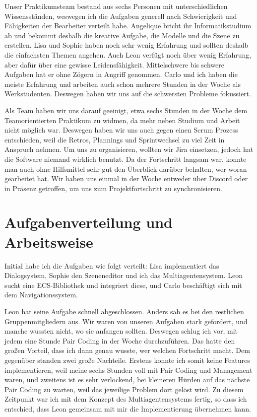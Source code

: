 Unser Praktikumsteam bestand aus sechs Personen mit unterschiedlichen Wissensständen, weswegen ich die Aufgaben generell nach Schwierigkeit und Fähigkeiten der Bearbeiter verteilt habe. Angelique bricht ihr Informatikstudium ab und bekommt deshalb die kreative Aufgabe, die Modelle und die Szene zu erstellen. Lisa und Sophie haben noch sehr wenig Erfahrung und sollten deshalb die einfachsten Themen angehen. Auch Leon verfügt noch über wenig Erfahrung, aber dafür über eine gewisse Leidensfähigkeit. Mittelschwere bis schwere Aufgaben hat er ohne Zögern in Angriff genommen. Carlo und ich haben die meiste Erfahrung und arbeiten auch schon mehrere Stunden in der Woche als Werkstudenten. Deswegen haben wir uns auf die schwersten Probleme fokussiert.

Als Team haben wir uns darauf geeinigt, etwa sechs Stunden in der Woche dem Teamorientierten Praktikum zu widmen, da mehr neben Studium und Arbeit nicht möglich war. Deswegen haben wir uns auch gegen einen Scrum Prozess entschieden, weil die Retros, Plannings und Sprintwechsel zu viel Zeit in Anspruch nehmen. Um uns zu organisieren, wollten wir Jira einsetzen, jedoch hat die Software niemand wirklich benutzt. Da der Fortschritt langsam war, konnte man auch ohne Hilfsmittel sehr gut den Überblick darüber behalten, wer woran gearbeitet hat. Wir haben uns einmal in der Woche entweder über Discord oder in Präsenz getroffen, um uns zum Projektfortschritt zu synchronisieren.

\section{Aufgabenverteilung und Arbeitsweise}

Initial habe ich die Aufgaben wie folgt verteilt: Lisa implementiert das Dialogsystem, Sophie den Szeneneditor und ich das Multiagentensystem. Leon sucht eine ECS-Bibliothek und integriert diese, und Carlo beschäftigt sich mit dem Navigationssystem.

Leon hat seine Aufgabe schnell abgeschlossen. Anders sah es bei den restlichen Gruppenmitgliedern aus. Wir waren von unseren Aufgaben stark gefordert, und manche wussten nicht, wo sie anfangen sollten. Deswegen schlug ich vor, mit jedem eine Stunde Pair Coding in der Woche durchzuführen. Das hatte den großen Vorteil, dass ich dann genau wusste, wer welchen Fortschritt macht. Dem gegenüber standen zwei große Nachteile. Erstens konnte ich somit keine Features implementieren, weil meine sechs Stunden voll mit Pair Coding und Management waren, und zweitens ist es sehr verlockend, bei kleineren Hürden auf das nächste Pair Coding zu warten, weil das jeweilige Problem dort gelöst wird. Zu diesem Zeitpunkt war ich mit dem Konzept des Multiagentensystems fertig, so dass ich entschied, dass Leon gemeinsam mit mir die Implementierung übernehmen kann.

